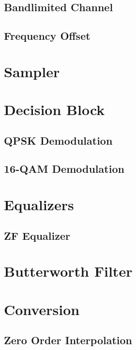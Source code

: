 \documentclass[]{article}
\begin{document}
\subsection{Bandlimited Channel}
\label{app:bandlimited}


\subsection{Frequency Offset}
\label{app:freq}


\section{Sampler}
\label{app:sampler}


\section{Decision Block}
\label{app:dblocks}
\subsection{QPSK Demodulation}
\label{app:qpsk_demod}


\subsection{16-QAM Demodulation}
\label{app:16qam_demod}


\section{Equalizers}
\subsection{ZF Equalizer}
\label{app:zf}



\section{Butterworth Filter}
\label{app:butterworth}


\section{Conversion}
\label{app:convert}
\subsection{Zero Order Interpolation}
\label{app:da}

\end{document}
